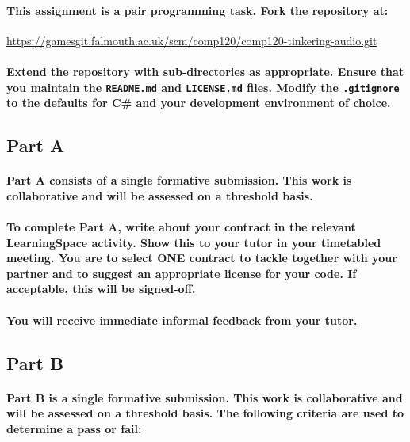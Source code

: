 \documentclass{../../fal_assignment}
\begin{document}
\paragraph{This assignment is a \textbf{pair programming task}. Fork the repository at:}

\url{https://gamesgit.falmouth.ac.uk/scm/comp120/comp120-tinkering-audio.git}

\paragraph{Extend the repository with sub-directories as appropriate. Ensure that you maintain the \texttt{README.md} and \texttt{LICENSE.md} files. Modify the \texttt{.gitignore} to the defaults for \textbf{C\#} and your development environment of choice.}

\subsection*{Part A}

\paragraph{Part A consists of a \textbf{single formative submission}. This work is \textbf{collaborative} and will be assessed on a \textbf{threshold} basis.}

\paragraph{To complete Part A, write about your contract in the relevant LearningSpace activity. Show this to your tutor in your timetabled meeting. You are to select \textbf{ONE} contract to tackle together with your partner and to suggest an appropriate license for your code. If acceptable, this will be signed-off.}

\paragraph{You will receive immediate \textbf{informal feedback} from your \textbf{tutor}.}

\subsection*{Part B}

\paragraph{Part B is a \textbf{single formative submission}. This work is \textbf{collaborative} and will be assessed on a \textbf{threshold} basis. The following criteria are used to determine a pass or fail:}
\end{document}
